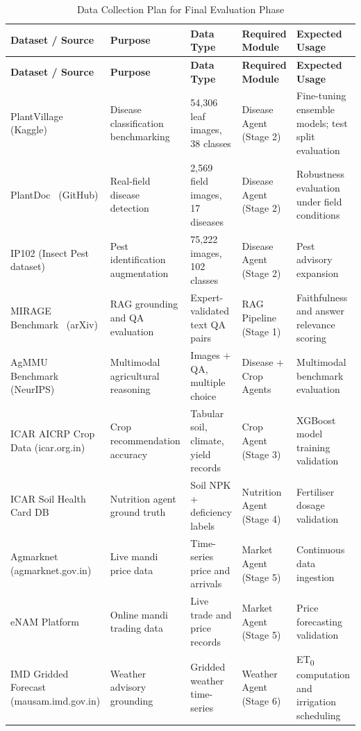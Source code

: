 \documentclass[12pt,a4paper]{article}
\begin{document}
\begingroup
\small
\setlength{\tabcolsep}{3.5pt}
\begin{longtable}{|p{2.9cm}|p{2.85cm}|p{2.4cm}|p{2.4cm}|p{2.85cm}|}
\caption{Data Collection Plan for Final Evaluation Phase}
\label{tab:datasets}\\
\hline
\textbf{Dataset / Source} & \textbf{Purpose} & \textbf{Data Type} & \textbf{Required Module} & \textbf{Expected Usage} \\
\hline
\endfirsthead
\hline
\textbf{Dataset / Source} & \textbf{Purpose} & \textbf{Data Type} & \textbf{Required Module} & \textbf{Expected Usage} \\
\hline
\endhead
\hline
\endfoot
PlantVillage~\cite{plantvillage2019} (Kaggle) & Disease classification benchmarking & 54,306 leaf images, 38 classes & Disease Agent (Stage 2) & Fine-tuning ensemble models; test split evaluation \\
\hline
PlantDoc~\cite{plantdoc2020} (GitHub) & Real-field disease detection & 2,569 field images, 17 diseases & Disease Agent (Stage 2) & Robustness evaluation under field conditions \\
\hline
IP102 (Insect Pest dataset) & Pest identification augmentation & 75,222 images, 102 classes & Disease Agent (Stage 2) & Pest advisory expansion \\
\hline
MIRAGE Benchmark~\cite{mirage2025} (arXiv) & RAG grounding and QA evaluation & Expert-validated text QA pairs & RAG Pipeline (Stage 1) & Faithfulness and answer relevance scoring \\
\hline
AgMMU Benchmark~\cite{agmmu2025} (NeurIPS) & Multimodal agricultural reasoning & Images + QA, multiple choice & Disease + Crop Agents & Multimodal benchmark evaluation \\
\hline
ICAR AICRP Crop Data (icar.org.in) & Crop recommendation accuracy & Tabular soil, climate, yield records & Crop Agent (Stage 3) & XGBoost model training validation \\
\hline
ICAR Soil Health Card DB & Nutrition agent ground truth & Soil NPK + deficiency labels & Nutrition Agent (Stage 4) & Fertiliser dosage validation \\
\hline
Agmarknet (agmarknet.gov.in) & Live mandi price data & Time-series price and arrivals & Market Agent (Stage 5) & Continuous data ingestion \\
\hline
eNAM Platform~\cite{enam2023} & Online mandi trading data & Live trade and price records & Market Agent (Stage 5) & Price forecasting validation \\
\hline
IMD Gridded Forecast (mausam.\allowbreak imd.\allowbreak gov.in) & Weather advisory grounding & Gridded weather time-series & Weather Agent (Stage 6) & ET\textsubscript{0} computation and irrigation scheduling \\

\end{longtable}
\end{document}
